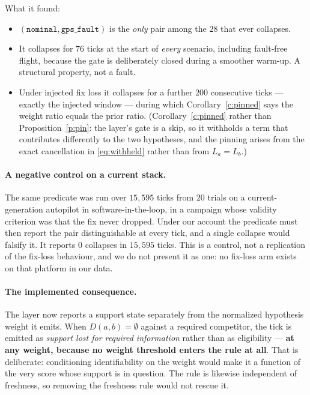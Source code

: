 \documentclass[11pt,a4paper]{article}
\theoremstyle{definition}
\begin{document}
What it found:

\begin{itemize}
\item $(\texttt{nominal},\texttt{gps\_fault})$ is the \emph{only} pair among
      the $28$ that ever collapses.
\item It collapses for $76$ ticks at the start of \emph{every} scenario,
      including fault-free flight, because the gate is deliberately closed
      during a smoother warm-up. A structural property, not a fault.
\item Under injected fix loss it collapses for a further $200$ consecutive
      ticks --- exactly the injected window --- during which
      Corollary~\ref{c:pinned} says the weight ratio equals the prior
      ratio. (Corollary~\ref{c:pinned} rather than Proposition~\ref{p:pin}:
      the layer's gate is a skip, so it withholds a term that contributes
      differently to the two hypotheses, and the pinning arises from the
      exact cancellation in \eqref{eq:withheld} rather than from $L_a=L_b$.)
\end{itemize}

\paragraph{A negative control on a current stack.} The same predicate was run
over $15{,}595$ ticks from $20$ trials on a current-generation autopilot in
software-in-the-loop, in a campaign whose validity criterion was that the fix
never dropped. Under our account the predicate must then report the pair
distinguishable at every tick, and a single collapse would falsify it. It
reports $0$ collapses in $15{,}595$ ticks. This is a control, not a
replication of the fix-loss behaviour, and we do not present it as one: no
fix-loss arm exists on that platform in our data.

\paragraph{The implemented consequence.} The layer now reports a support state
separately from the normalized hypothesis weight it emits. When
$D(a,b)=\emptyset$ against a required
competitor, the tick is emitted as \emph{support lost for required
information} rather than as eligibility --- \textbf{at any weight, because no
weight threshold enters the rule at all}. That is deliberate: conditioning
identifiability on the weight would make it a function of the very score whose
support is in question. The rule is likewise independent of
freshness, so removing the freshness rule would not rescue it.
\end{document}
